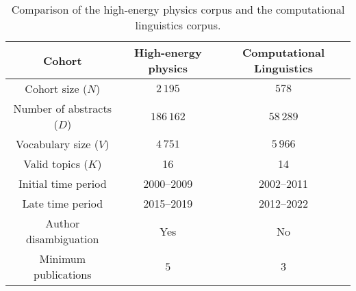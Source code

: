 \begin{table}
\caption{Comparison of the high-energy physics corpus and the computational linguistics corpus.}
\label{table:corpora}
\begin{tabular}{|c|c|c|}
\toprule
Cohort & High-energy physics & Computational Linguistics \\
\midrule
Cohort size ($N$) & $2\,195$ & $578$ \\
Number of abstracts ($D$) & $186\,162$ & $58\,289$ \\
Vocabulary size ($V$) & $4\,751$ & $5\,966$ \\
Valid topics ($K$) & 16 & 14 \\
Initial time period & 2000--2009 & 2002--2011 \\
Late time period & 2015--2019 & 2012--2022 \\
Author disambiguation & Yes & No \\
Minimum publications & $5$ & $3$ \\
\bottomrule
\end{tabular}
\end{table}
